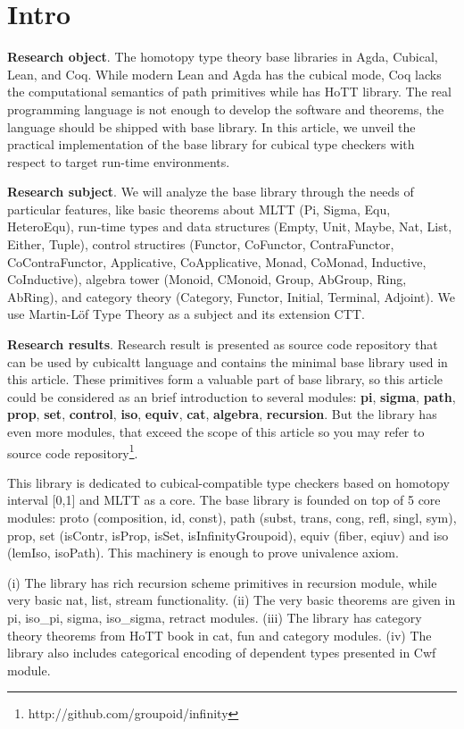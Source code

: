 \documentclass{article}
\begin{document}
\newpage
\tableofcontents

\newpage
\section{Intro}

{\bf Research object}. The homotopy type theory base libraries in Agda, Cubical, Lean, and Coq.
While modern Lean and Agda has the cubical mode, Coq lacks the computational semantics of path primitives
while has HoTT library. The real programming language is not enough to
develop the software and theorems, the language should be shipped with base library. In this article,
we unveil the practical implementation of the base library for cubical type checkers with respect to
target run-time environments.

{\bf Research subject}. We will analyze the base library through the needs of particular features,
like basic theorems about MLTT (Pi, Sigma, Equ, HeteroEqu), run-time types and data
structures (Empty, Unit, Maybe, Nat, List, Either, Tuple), control structires (Functor, CoFunctor,
ContraFunctor, CoContraFunctor, Applicative, CoApplicative, Monad, CoMonad, Inductive, CoInductive),
algebra tower (Monoid, CMonoid, Group, AbGroup, Ring, AbRing), and category
theory (Category, Functor, Initial, Terminal, Adjoint).
We use Martin-Löf Type Theory as a subject and its extension CTT.

{\bf Research results}. Research result is presented as source code repository that can be used by
cubicaltt language and contains the minimal base library used in this article.
These primitives form a valuable part of base library, so this article could be
considered as an brief introduction to several modules: {\bf pi},
{\bf sigma}, {\bf path}, {\bf prop}, {\bf set}, {\bf control}, {\bf iso},
{\bf equiv}, {\bf cat}, {\bf algebra}, {\bf recursion}.
But the library has even more modules, that
exceed the scope of this article so you may refer to source code
repository\footnote{http://github.com/groupoid/infinity}.

This library is dedicated to cubical-compatible type checkers \cite{Mortberg17} based
on homotopy interval [0,1] and MLTT as a core. The base library is
founded on top of 5 core modules: proto (composition, id, const),
path (subst, trans, cong, refl, singl, sym), prop, set (isContr, isProp, isSet, isInfinityGroupoid),
equiv (fiber, eqiuv) and iso (lemIso, isoPath). This machinery is enough to prove univalence axiom.

(i) The library has rich recursion scheme primitives
in recursion module, while very basic nat, list, stream
functionality. (ii) The very basic theorems are given
in pi, iso\_pi, sigma, iso\_sigma, retract modules.
(iii) The library has category theory theorems from
HoTT book in cat, fun and category modules.
(iv) The library also includes categorical encoding
of dependent types presented in Cwf module.
\end{document}

